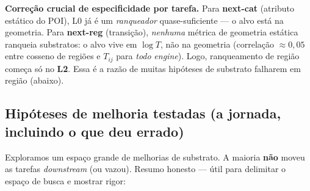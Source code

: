\documentclass[11pt,a4paper]{article}
\begin{document}
\noindent\textbf{Correção crucial de especificidade por tarefa.} Para \textbf{next-cat} (atributo
estático do POI), L0 já é um \emph{ranqueador} quase-suficiente --- o alvo está na geometria. Para
\textbf{next-reg} (transição), \emph{nenhuma} métrica de geometria estática ranqueia substratos: o
alvo vive em $\log T$, não na geometria (correlação $\approx 0{,}05$ entre cosseno de regiões e
$T_{ij}$ para \emph{todo} \textit{engine}). Logo, ranqueamento de região começa só no \textbf{L2}.
Essa é a razão de muitas hipóteses de substrato falharem em região (abaixo).

\subsection{Hipóteses de melhoria testadas (a jornada, incluindo o que deu errado)}\label{sec:falhas}

Exploramos um espaço grande de melhorias de substrato. A maioria \textbf{não} moveu as tarefas
\textit{downstream} (ou vazou). Resumo honesto --- útil para delimitar o espaço de busca e mostrar
rigor:
\end{document}
